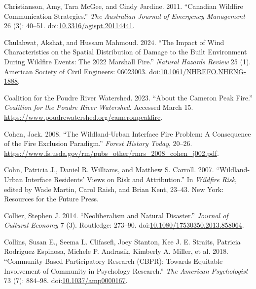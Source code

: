 \documentclass[
]{article}
\newlength{\cslhangindent}
\newenvironment{CSLReferences}[2] %
 {\begin{list}{}{%
  \setlength{\itemindent}{0pt}
  \setlength{\leftmargin}{0pt}
  \setlength{\parsep}{0pt}
  \ifodd #1
   \setlength{\leftmargin}{\cslhangindent}
   \setlength{\itemindent}{-1\cslhangindent}
  \fi
  \setlength{\itemsep}{#2\baselineskip}}}
 {\end{list}}
\begin{document}
\begin{CSLReferences}{1}{0}
Christianson, Amy, Tara McGee, and Cindy Jardine. 2011. {``Canadian Wildfire Communication Strategies.''} \emph{The Australian Journal of Emergency Management} 26 (3): 40--51. doi:\href{https://doi.org/10.3316/agispt.20114441}{10.3316/agispt.20114441}.

Chulahwat, Akshat, and Hussam Mahmoud. 2024. {``The {Impact} of {Wind Characteristics} on the {Spatial Distribution} of {Damage} to the {Built Environment} During {Wildfire Events}: {The} 2022 {Marshall Fire}.''} \emph{Natural Hazards Review} 25 (1). American Society of Civil Engineers: 06023003. doi:\href{https://doi.org/10.1061/NHREFO.NHENG-1888}{10.1061/NHREFO.NHENG-1888}.

Coalition for the Poudre River Watershed. 2023. {``About the {Cameron Peak Fire}.''} \emph{Coalition for the Poudre River Watershed}. Accessed March 15. \url{https://www.poudrewatershed.org/cameronpeakfire}.

Cohen, Jack. 2008. {``The Wildland-Urban Interface Fire Problem: {A} Consequence of the Fire Exclusion Paradigm.''} \emph{Forest History Today}, 20--26. \url{https://www.fs.usda.gov/rm/pubs_other/rmrs_2008_cohen_j002.pdf}.

Cohn, Patricia J., Daniel R. Williams, and Matthew S. Carroll. 2007. {``Wildland-{Urban Interface Residents}' {Views} on {Risk} and {Attribution}.''} In \emph{Wildfire {Risk}}, edited by Wade Martin, Carol Raish, and Brian Kent, 23--43. New York: Resources for the Future Press.

Collier, Stephen J. 2014. {``Neoliberalism and {Natural Disaster}.''} \emph{Journal of Cultural Economy} 7 (3). Routledge: 273--90. doi:\href{https://doi.org/10.1080/17530350.2013.858064}{10.1080/17530350.2013.858064}.

Collins, Susan E., Seema L. Clifasefi, Joey Stanton, Kee J. E. Straits, Patricia Rodriguez Espinosa, Michele P. Andrasik, Kimberly A. Miller, et al. 2018. {``Community-Based {Participatory Research} ({CBPR}): {Towards Equitable Involvement} of {Community} in {Psychology Research}.''} \emph{The American Psychologist} 73 (7): 884--98. doi:\href{https://doi.org/10.1037/amp0000167}{10.1037/amp0000167}.


\end{CSLReferences}
\end{document}
